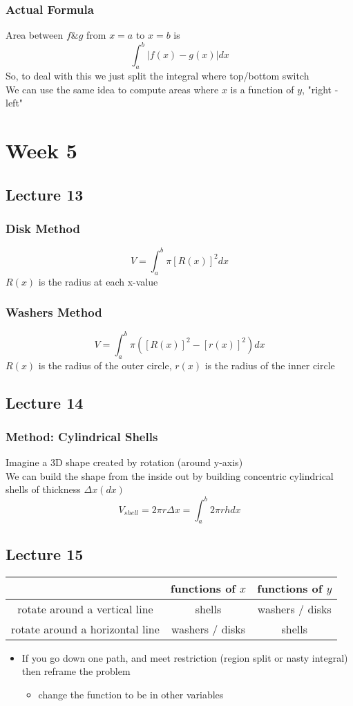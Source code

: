 \documentclass[12pt, letterpaper]{article}
\begin{document}
\subsubsection*{Actual Formula}
Area between $f\&g$ from $x=a$ to $x=b$ is \[\int_{a}^{b}|f(x)-g(x)|dx\]
So, to deal with this we just split the integral where top/bottom switch \\
We can use the same idea to compute areas where $x$ is a function of $y$, "right - left"

\section{Week 5}
\subsection{Lecture 13}
\subsubsection{Disk Method}
\[V=\int_{a}^{b}\pi[R(x)]^2dx\] $R(x)$ is the radius at each x-value
\subsubsection{Washers Method}
\[V=\int_{a}^{b}\pi([R(x)]^2 - [r(x)]^2)dx\] $R(x)$ is the radius of the outer circle, $r(x)$ is the radius of the inner circle
\subsection{Lecture 14}
\subsubsection{Method: Cylindrical Shells}
Imagine a 3D shape created by rotation (around y-axis) \\
We can build the shape from the inside out by building concentric cylindrical shells of thickness $\Delta x(dx)$
\[V_{shell} = 2\pi r\Delta x = \int_{a}^{b}2\pi rh dx\]
\subsection{Lecture 15}
\begin{center}
\begin{tabular}{c|c|c}
                                    &functions of $x$                   &functions of $y$ \\ \hline
    rotate around a vertical line   &shells                             &washers / disks  \\ \hline
    rotate around a horizontal line &washers / disks                    &shells
\end{tabular}
\end{center}
\begin{itemize}
    \item If you go down one path, and meet restriction (region split or nasty integral) then reframe the problem 
    \begin{itemize}
        \item change the function to be in other variables
    \end{itemize}
\end{itemize}
\end{document}
